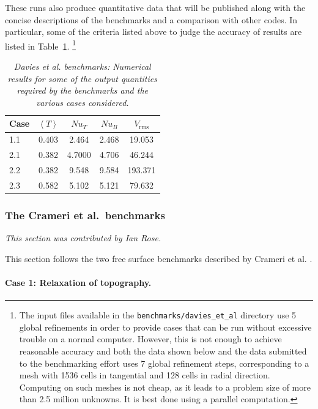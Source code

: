 \documentclass{article}
\begin{document}
These runs also produce quantitative data that will be published along with
the concise descriptions of the benchmarks and a comparison with other
codes. In particular, some of the criteria listed above to judge the accuracy
of results are listed in Table~\ref{tab:davies-et-al-results}.%
\footnote{The input files available in the \texttt{benchmarks/davies\_et\_al}
  directory use 5 global refinements in order to provide cases that can be run
  without excessive trouble on a normal computer. However, this is not enough
  to achieve reasonable accuracy and both the data shown below and the data
  submitted to the benchmarking effort uses 7
  global refinement steps, corresponding to a mesh with 1536 cells in
  tangential and 128 cells in radial direction. Computing on such meshes is
  not cheap, as it leads to a problem size of more than 2.5 million
  unknowns. It is best done using a parallel computation.}

\begin{table}[tbp]
  \centering
  \begin{tabular}{|l|c|c|c|c|}
    \hline
    Case & $\left<T\right>$ & $Nu_T$ & $Nu_B$ & $V_{\text{rms}}$
    \\ \hline
    1.1 & 0.403 & 2.464 & 2.468 & 19.053 
    \\ 
    2.1 & 0.382 & 4.7000 & 4.706 & 46.244
    \\ 
    2.2 & 0.382 & 9.548 & 9.584 & 193.371
    \\ 
    2.3 & 0.582 & 5.102 & 5.121 & 79.632
    \\ \hline
  \end{tabular}
  \caption{\it Davies et al. benchmarks: Numerical results for some of the output quantities required by the benchmarks and the various cases considered.}
  \label{tab:davies-et-al-results}
\end{table}


\subsubsection{The Crameri et al.~benchmarks}
\label{sec:benchmark-crameri}

\textit{This section was contributed by Ian Rose.}

This section follows the two free surface benchmarks described by Crameri et al. \cite{CSG12}.  

\paragraph{Case 1: Relaxation of topography.}
\label{sec:benchmark-crameri-case-1}
\end{document}
